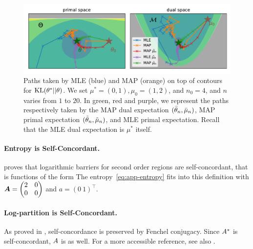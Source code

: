 \begin{figure}[ht]
	\centering
	\includegraphics[width=.9\textwidth]{figs/2d/gaussian_paths.pdf}
	\caption{
		Paths taken by MLE (blue) and MAP (orange) on top of contours for $\mathrm{KL}(\theta^* || \theta)$. 
		We set $\mu^*=(0, 1), \mu_0 = (1, 2)$, and $n_0=4$, and $n$ varies from $1$ to $20$.
		In green, red and purple, we represent the paths respectively taken by the MAP dual expectation  $(\bar{\theta}_n, \bar \mu_n)$, MAP primal expectation $(\tilde{\theta}_n,\tilde\mu_n)$, and MLE primal expectation. Recall that the MLE dual expectation is $\mu^*$ itself.
	}
	\label{fig:gaussian-paths}
\end{figure}


\paragraph{Entropy is Self-Concordant.}
\citet[Example 4.1.1.4,   p.177]{nesterov2003introductory} proves that logarithmic barriers for second order regions are self-concordant, 
that is functions of the form 
The entropy~\eqref{eq:app-entropy} fits into this definition with ${\bm{A}} = \begin{pmatrix} 2 & 0 \\ 0 & 0 \end{pmatrix}$ and $a = ( 0 \ 1 )^\top$.

\paragraph{Log-partition is Self-Concordant.}
As proved in \citet{nesterov1994interior}, self-concordance is preserved by Fenchel conjugacy.
Since ${A^*}$ is self-concordant, $A$ is as well.
For a more accessible reference, see also \citet[Prop.~6]{sun2019generalized}.

